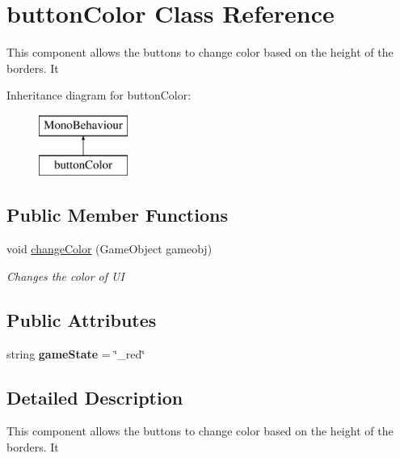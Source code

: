 \hypertarget{classbutton_color}{\section{button\+Color Class Reference}
\label{classbutton_color}
}


This component allows the buttons to change color based on the height of the borders. It  


Inheritance diagram for button\+Color\+:\begin{figure}[H]
\begin{center}
\leavevmode
\includegraphics[height=2.000000cm]{classbutton_color}
\end{center}
\end{figure}
\subsection*{Public Member Functions}
\begin{DoxyCompactItemize}
\item 
void \hyperlink{classbutton_color_a9759404b4323b741101b82bfeece5e91}{change\+Color} (Game\+Object gameobj)
\begin{DoxyCompactList}\small\item\em Changes the color of U\+I \end{DoxyCompactList}\end{DoxyCompactItemize}
\subsection*{Public Attributes}
\begin{DoxyCompactItemize}
\item 
\hypertarget{classbutton_color_a4da499fd4e889af198bdd7c2060460c4}{string {\bfseries game\+State} = \char`\"{}\+\_\+red\char`\"{}}\label{classbutton_color_a4da499fd4e889af198bdd7c2060460c4}

\end{DoxyCompactItemize}


\subsection{Detailed Description}
This component allows the buttons to change color based on the height of the borders. It 



